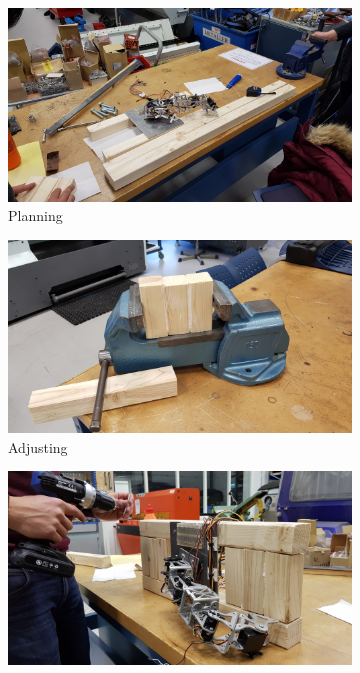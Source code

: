 \documentclass[11pt,a4paper, titlepage]{article}
\begin{document}
\begin{figure}[H]
\centering
\begin{subfigure}[b]{0.45\linewidth}
\includegraphics[width=\textwidth]{../Diagrams/plank1.jpg}
\caption{Planning}                		
\end{subfigure}
\begin{subfigure}[b]{0.45\linewidth}
\includegraphics[width=\textwidth]{../Diagrams/plank2.jpg}  
\caption{Adjusting}              		
\end{subfigure}
\begin{subfigure}[b]{0.45\linewidth}
\includegraphics[width=\textwidth]{../Diagrams/plank3.jpg}  

\end{subfigure}
\end{figure}
\end{document}
